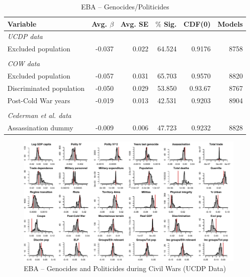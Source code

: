 \documentclass[a4paper,12pt]{article}
\begin{document}
\begin{table}[H]
\centering
\begin{tabular}{lrrrrr}
\hline
\textbf{Variable} & \textbf{Avg. $\beta$} & \textbf{Avg. SE} & \textbf{$\%$ Sig.} & \textbf{CDF(0)} & \textbf{Models} \\ \hline
\textit{UCDP data} &  &  &  &  &  \\
Excluded population & -0.037 & 0.022 & 64.524 & 0.9176 & 8758 \\
 &  &  &  &  &  \\
\textit{COW data} &  &  &  &  &  \\
Excluded population & -0.057 & 0.031 & 65.703 & 0.9570 & 8820 \\
Discriminated population & -0.050 & 0.029 & 53.850 & 0.93.67 & 8767 \\
Post-Cold War years & -0.019 & 0.013 & 42.531 & 0.9203 & 8904 \\
 &  &  &  &  &  \\
\textit{Cederman et al. data} &  &  &  &  &  \\
Assassination dummy & -0.009 & 0.006 & 47.723 & 0.9232 & 8828 \\ \hline
\end{tabular}
\caption{EBA -- Genocides/Politicides}
\label{tab:uamk1}
\end{table}

\newpage
\clearpage
\begin{figure}
    \centering
    \includegraphics[width=\textwidth]{images/uamk-ucdp.pdf}
    \caption{EBA -- Genocides and Politicides during Civil Wars (UCDP Data)}
    \label{fig:uamk-ucdp}
\end{figure}
\clearpage
\end{document}
